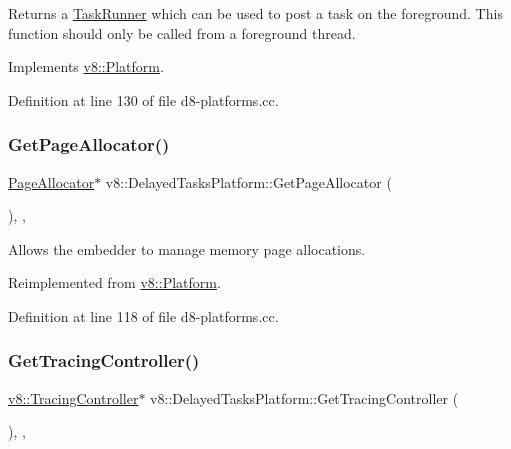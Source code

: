 Returns a \mbox{\hyperlink{classv8_1_1TaskRunner}{Task\+Runner}} which can be used to post a task on the foreground. This function should only be called from a foreground thread. 

Implements \mbox{\hyperlink{classv8_1_1Platform_af0d18c6bbefa133c5d11ec8a460d0278}{v8\+::\+Platform}}.



Definition at line 130 of file d8-\/platforms.\+cc.

\mbox{\label{classv8_1_1DelayedTasksPlatform_aa4c38247e7c468f4ad4f449451bb08ae}} 
\subsubsection{\texorpdfstring{Get\+Page\+Allocator()}{GetPageAllocator()}}
{\footnotesize\ttfamily \mbox{\hyperlink{classv8_1_1PageAllocator}{Page\+Allocator}}$\ast$ v8\+::\+Delayed\+Tasks\+Platform\+::\+Get\+Page\+Allocator (\begin{DoxyParamCaption}{ }\end{DoxyParamCaption})\hspace{0.3cm}{\ttfamily [inline]}, {\ttfamily [override]}, {\ttfamily [virtual]}}

Allows the embedder to manage memory page allocations. 

Reimplemented from \mbox{\hyperlink{classv8_1_1Platform_ab7c1886dd8131f7389b805bc98276702}{v8\+::\+Platform}}.



Definition at line 118 of file d8-\/platforms.\+cc.

\mbox{\label{classv8_1_1DelayedTasksPlatform_a7d8406d5b169da8645d65bb06bc8bbc6}} 
\subsubsection{\texorpdfstring{Get\+Tracing\+Controller()}{GetTracingController()}}
{\footnotesize\ttfamily \mbox{\hyperlink{classv8_1_1TracingController}{v8\+::\+Tracing\+Controller}}$\ast$ v8\+::\+Delayed\+Tasks\+Platform\+::\+Get\+Tracing\+Controller (\begin{DoxyParamCaption}{ }\end{DoxyParamCaption})\hspace{0.3cm}{\ttfamily [inline]}, {\ttfamily [override]}, {\ttfamily [virtual]}}

